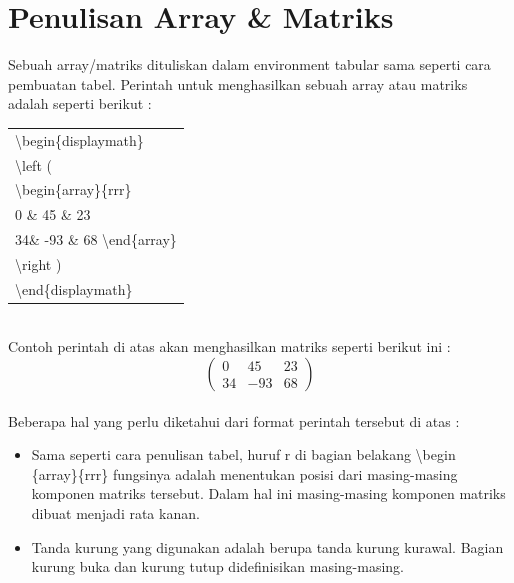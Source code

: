 \section{Penulisan Array \& Matriks}
Sebuah array/matriks dituliskan dalam environment tabular sama seperti cara pembuatan
tabel. Perintah untuk menghasilkan sebuah array atau matriks adalah seperti berikut :\\[0.5 cm]
\begin{tabular}{|p{13.5 cm}|}
\hline
\textbackslash begin\{displaymath\}\\
   \textbackslash left (\\
\textbackslash begin\{array\}\{rrr\}\\
0 \& 45 \& 23 \\
34\& -93 \& 68 \textbackslash end\{array\}\\
\textbackslash right )\\

\textbackslash end\{displaymath\}\\
\hline
\end{tabular}\\[0.5 cm]
Contoh perintah di atas akan menghasilkan matriks seperti berikut ini :\\[0.5 cm]
\begin{displaymath}
\left (
\begin{array}{rrr}
0 & 45 & 23 \\
34& -93 & 68 \end{array}
\right )
\end{displaymath}\\[0.5 cm]
Beberapa hal yang perlu diketahui dari format perintah tersebut di atas :
\begin{itemize}
\item	Sama seperti cara penulisan tabel, huruf r di bagian belakang \textbackslash begin\\\{array\}\{rrr\} fungsinya adalah menentukan posisi dari masing-masing komponen matriks tersebut. Dalam hal ini masing-masing komponen matriks dibuat menjadi rata kanan.
\item	Tanda kurung yang digunakan adalah berupa tanda kurung kurawal. Bagian kurung buka dan kurung tutup didefinisikan masing-masing.
\end{itemize}
